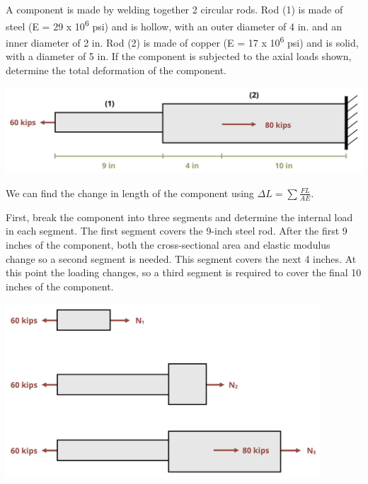 \documentclass[
  letterpaper,
  DIV=11,
  numbers=noendperiod]{scrreprt}
\begin{document}
\begin{tcolorbox}[enhanced jigsaw, breakable, opacityback=0, toptitle=1mm, left=2mm, colback=white, opacitybacktitle=0.6, colframe=quarto-callout-tip-color-frame, titlerule=0mm, arc=.35mm, leftrule=.75mm, bottomtitle=1mm, colbacktitle=quarto-callout-tip-color!10!white, rightrule=.15mm, title={Example 5.3}, bottomrule=.15mm, toprule=.15mm, coltitle=black]

A component is made by welding together 2 circular rods. Rod (1) is made
of steel (E = 29 x 10\textsuperscript{6} psi) and is hollow, with an
outer diameter of 4 in. and an inner diameter of 2 in. Rod (2) is made
of copper (E = 17 x 10\textsuperscript{6} psi) and is solid, with a
diameter of 5 in. If the component is subjected to the axial loads
shown, determine the total deformation of the component.

\begin{center}
\includegraphics{images/PNGs/Example 5.3 part 1.png}
\end{center}

\begin{tcolorbox}[enhanced jigsaw, breakable, opacityback=0, toptitle=1mm, left=2mm, colback=white, opacitybacktitle=0.6, colframe=quarto-callout-tip-color-frame, titlerule=0mm, arc=.35mm, leftrule=.75mm, bottomtitle=1mm, colbacktitle=quarto-callout-tip-color!10!white, rightrule=.15mm, title={Solution}, bottomrule=.15mm, toprule=.15mm, coltitle=black]

We can find the change in length of the component using
\(\Delta L=\sum \frac{F L}{A E}\).

First, break the component into three segments and determine the
internal load in each segment. The first segment covers the 9-inch steel
rod. After the first 9 inches of the component, both the cross-sectional
area and elastic modulus change so a second segment is needed. This
segment covers the next 4 inches. At this point the loading changes, so
a third segment is required to cover the final 10 inches of the
component.

\begin{center}
\includegraphics[width=4.625in,height=\textheight]{images/PNGs/Example 5.3 part 2.png}
\end{center}


\end{tcolorbox}
\end{tcolorbox}
\end{document}
